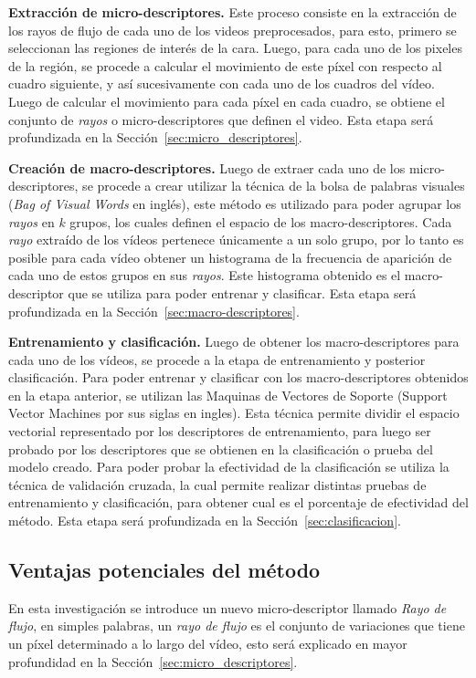 \textbf{Extracción de micro-descriptores.}
Este proceso consiste en la extracción de los rayos de flujo de cada uno de los videos preprocesados, para esto, primero se seleccionan las regiones de interés de la cara. Luego, para cada uno de los pixeles de la región, se procede a calcular el movimiento de este píxel con respecto al cuadro siguiente, y así sucesivamente con cada uno de los cuadros del vídeo. Luego de calcular el movimiento para cada píxel en cada cuadro, se obtiene el conjunto de \textit{rayos} o micro-descriptores que definen el video. Esta etapa será profundizada en la Sección~\ref{sec:micro_descriptores}.


\textbf{Creación de macro-descriptores.}
Luego de extraer cada uno de los micro-descriptores, se procede a crear utilizar la técnica de la bolsa de palabras visuales (\textit{Bag of Visual Words} en inglés), este método es utilizado para poder agrupar los \textit{rayos} en $k$ grupos, los cuales definen el espacio de los macro-descriptores. Cada \textit{rayo} extraído de los vídeos pertenece únicamente a un solo grupo, por lo tanto es posible para cada vídeo obtener un histograma de la frecuencia de aparición de cada uno de estos grupos en sus \textit{rayos}. Este histograma obtenido es el macro-descriptor que se utiliza para poder entrenar y clasificar. Esta etapa será profundizada en la Sección~\ref{sec:macro-descriptores}.


\textbf{Entrenamiento y clasificación.}
Luego de obtener los macro-des\-crip\-tores para cada uno de los vídeos, se procede a la etapa de entrenamiento y posterior clasificación. Para poder entrenar y clasificar con los macro-descriptores obtenidos en la etapa anterior, se utilizan las Maquinas de Vectores de Soporte (Support Vector Machines por sus siglas en ingles). Esta técnica permite dividir el espacio vectorial representado por los descriptores de entrenamiento, para luego ser probado por los descriptores que se obtienen en la clasificación o prueba del modelo creado. Para poder probar la efectividad de la clasificación se utiliza la técnica de validación cruzada, la cual permite realizar distintas pruebas de entrenamiento y clasificación, para obtener cual es el porcentaje de efectividad del método. Esta etapa será profundizada en la Sección~\ref{sec:clasificacion}.

\subsection{Ventajas potenciales del método}
En esta investigación se introduce un nuevo micro-descriptor llamado \textit{Rayo de flujo}, en simples palabras, 
un \textit{rayo de flujo} es el conjunto de variaciones que tiene un píxel determinado a lo largo del vídeo, esto será explicado en mayor profundidad en la Sección~\ref{sec:micro_descriptores}.

